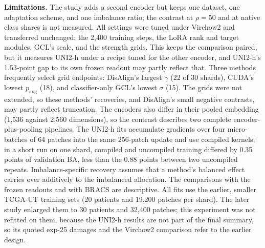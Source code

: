 \textbf{Limitations.} The study adds a second encoder but keeps one dataset, one adaptation scheme, and one imbalance ratio; the contrast at $\rho=50$ and at native class shares is not measured. All settings were tuned under Virchow2 and transferred unchanged: the 2,400 training steps, the LoRA rank and target modules, GCL's scale, and the strength grids. This keeps the comparison paired, but it measures UNI2-h under a recipe tuned for the other encoder, and UNI2-h's 1.53-point gap to its own frozen readout may partly reflect that. Three methods frequently select grid endpoints: DisAlign's largest $\gamma$ (22 of 30 shards), CUDA's lowest $p_{\mathrm{aug}}$ (18), and classifier-only GCL's lowest $\sigma$ (15). The grids were not extended, so these methods' recoveries, and DisAlign's small negative contrasts, may partly reflect truncation. The encoders also differ in their pooled embedding (1,536 against 2,560 dimensions), so the contrast describes two complete encoder-plus-pooling pipelines. The UNI2-h fits accumulate gradients over four micro-batches of 64 patches into the same 256-patch update and use compiled kernels; in a short run on one shard, compiled and uncompiled training differed by 0.35 points of validation BA, less than the 0.88 points between two uncompiled repeats. Imbalance-specific recovery assumes that a method's balanced effect carries over additively to the imbalanced allocation. The comparisons with the frozen readouts and with BRACS are descriptive. All fits use the earlier, smaller TCGA-UT training sets (20 patients and 19,200 patches per shard). The later study enlarged them to 30 patients and 32,400 patches; this experiment was not refitted on them, because the UNI2-h results are not part of the final summary, so its quoted exp-25 damages and the Virchow2 comparison refer to the earlier design.
